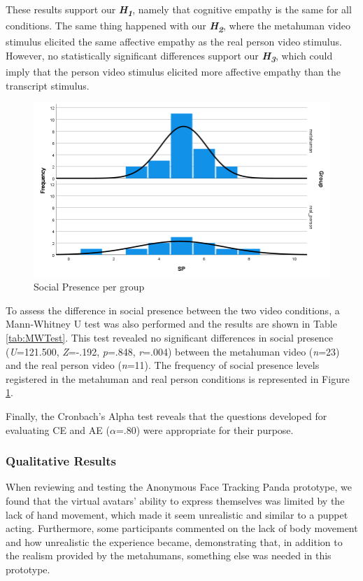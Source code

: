 These results support our \textbf{\textit{H\textsubscript{1}}}, namely that cognitive empathy is the same for all conditions. The same thing happened with our \textbf{\textit{H\textsubscript{2}}}, where the metahuman video stimulus elicited the same affective empathy as the real person video stimulus. However, no statistically significant differences support our \textbf{\textit{H\textsubscript{3}}}, which could imply that the person video stimulus elicited more affective empathy than the transcript stimulus.

\begin{figure}[!htb]
\includegraphics[width=\textwidth]{figures/MWSample.png}
\centering
\caption{Social Presence per group}
\label{fig:MWSample}
\end{figure}

To assess the difference in social presence between the two video conditions, a Mann-Whitney U test was also performed and the results are shown in Table \ref{tab:MWTest}. This test revealed no significant differences in social presence (\textit{U}=121.500, \textit{Z}=-.192, \textit{p}=.848, \textit{r}=.004) between the metahuman video (\textit{n}=23) and the real person video (\textit{n}=11). The frequency of social presence levels registered in the metahuman and real person conditions is represented in Figure \ref{fig:MWSample}.

Finally, the Cronbach's Alpha test reveals that the questions developed for evaluating CE and AE ($\alpha$=.80) were appropriate for their purpose.

\subsubsection{Qualitative Results}
When reviewing and testing the Anonymous Face Tracking Panda prototype, we found that the virtual avatars' ability to express themselves was limited by the lack of hand movement, which made it seem unrealistic and similar to a puppet acting. Furthermore, some participants commented on the lack of body movement and how unrealistic the experience became, demonstrating that, in addition to the realism provided by the metahumans, something else was needed in this prototype.

